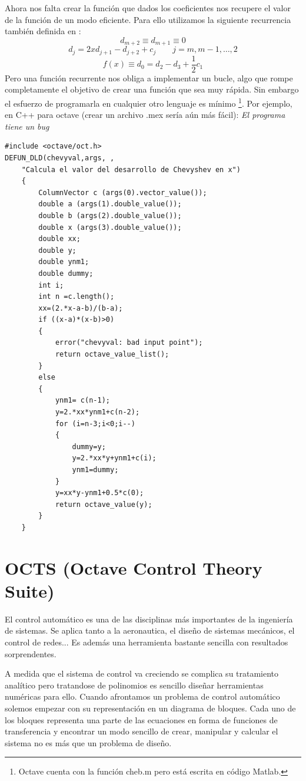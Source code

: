 Ahora nos falta crear la función que dados los coeficientes nos
recupere el valor de la función de un modo eficiente. Para ello
utilizamos la siguiente recurrencia también definida en
\cite{Numerical}:
$$d_{m+2}\equiv d_{m+1}\equiv0$$
$$d_{j}=2xd_{j+1}-d_{j+2}+c_{j}\qquad j=m,m-1,\ldots,2$$
$$f(x)\equiv d_{0}=d_{2}-d_{3}+\frac{1}{2}c_{1}$$ Pero una función
recurrente nos obliga a implementar un bucle, algo que rompe
completamente el objetivo de crear una función que sea muy rápida. Sin
embargo el esfuerzo de programarla en cualquier otro lenguaje es
mínimo%
\footnote{Octave cuenta con la función cheb.m pero está escrita en
  código Matlab.%
}. Por ejemplo, en C++ para octave (crear un archivo .mex sería aún
más fácil): \emph{El programa tiene un bug}

\begin{verbatim}
#include <octave/oct.h>
DEFUN_DLD(chevyval,args, ,
    "Calcula el valor del desarrollo de Chevyshev en x")
    {
        ColumnVector c (args(0).vector_value());
        double a (args(1).double_value());
        double b (args(2).double_value());
        double x (args(3).double_value());
        double xx;
        double y;
        double ynm1;
        double dummy;
        int i;
        int n =c.length();
        xx=(2.*x-a-b)/(b-a);
        if ((x-a)*(x-b)>0)
        {
            error("chevyval: bad input point");
            return octave_value_list();
        }
        else
        {
            ynm1= c(n-1);
            y=2.*xx*ynm1+c(n-2);
            for (i=n-3;i<0;i--)
            {
                dummy=y;
                y=2.*xx*y+ynm1+c(i);
                ynm1=dummy;
            }
            y=xx*y-ynm1+0.5*c(0);
            return octave_value(y);
        }
    }
\end{verbatim}


\section{OCTS (Octave Control Theory Suite)}

El control automático es una de las disciplinas más importantes de
la ingeniería de sistemas. Se aplica tanto a la aeronautica, el diseño
de sistemas mecánicos, el control de redes... Es además una herramienta
bastante sencilla con resultados sorprendentes.

A medida que el sistema de control va creciendo se complica su tratamiento
analítico pero tratandose de polinomios es sencillo diseñar herramientas
numéricas para ello. Cuando afrontamos un problema de control automático
solemos empezar con su representación en un diagrama de bloques. Cada
uno de los bloques representa una parte de las ecuaciones en forma
de funciones de transferencia y encontrar un modo sencillo de crear,
manipular y calcular el sistema no es más que un problema de diseño.

